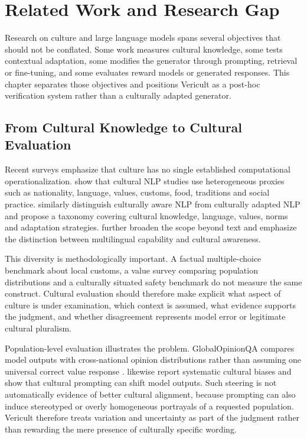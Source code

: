\chapter{Related Work and Research Gap}
\label{ch:related}

Research on culture and large language models spans several objectives that should not be conflated. Some work measures cultural knowledge, some tests contextual adaptation, some modifies the generator through prompting, retrieval or fine-tuning, and some evaluates reward models or generated responses. This chapter separates those objectives and positions Vericult as a post-hoc verification system rather than a culturally adapted generator.

\section{From Cultural Knowledge to Cultural Evaluation}

Recent surveys emphasize that culture has no single established computational operationalization. \textcite{adilazuarda2024culture} show that cultural NLP studies use heterogeneous proxies such as nationality, language, values, customs, food, traditions and social practice. \textcite{liu2025culturallyaware} similarly distinguish culturally aware NLP from culturally adapted NLP and propose a taxonomy covering cultural knowledge, language, values, norms and adaptation strategies. \textcite{pawar2025culturalawareness} further broaden the scope beyond text and emphasize the distinction between multilingual capability and cultural awareness.

This diversity is methodologically important. A factual multiple-choice benchmark about local customs, a value survey comparing population distributions and a culturally situated safety benchmark do not measure the same construct. Cultural evaluation should therefore make explicit what aspect of culture is under examination, which context is assumed, what evidence supports the judgment, and whether disagreement represents model error or legitimate cultural pluralism.

Population-level evaluation illustrates the problem. GlobalOpinionQA compares model outputs with cross-national opinion distributions rather than assuming one universal correct value response \parencite{durmus2023globalopinionqa}. \textcite{tao2024culturalbias} likewise report systematic cultural biases and show that cultural prompting can shift model outputs. Such steering is not automatically evidence of better cultural alignment, because prompting can also induce stereotyped or overly homogeneous portrayals of a requested population. Vericult therefore treats variation and uncertainty as part of the judgment rather than rewarding the mere presence of culturally specific wording.

